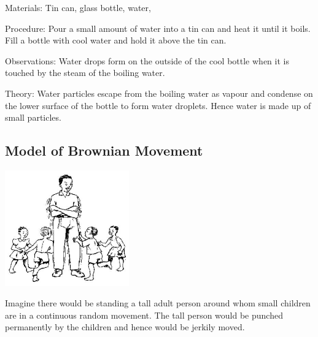 \begin{multicols}{2}
\begin{description*}
\item[Materials:]{Tin can, glass bottle, water, }
\item[Procedure:]{Pour a small amount of water into a tin can and heat it until it boils. Fill a bottle with cool water and hold it above the tin can.}
\item[Observations:]{Water drops form on the outside of the cool bottle when it is touched by the steam of the boiling water.}
\item[Theory:]{Water particles escape from the boiling water as vapour and condense on the lower surface of the bottle to form water droplets. Hence water is made up of small particles.}
\end{description*}

\subsection{Model of Brownian Movement}

\begin{center}
\includegraphics[width=0.4\textwidth]{./img/source/brownian.jpg}
\end{center}

Imagine there would be standing a tall adult person around whom small children are in a
continuous random movement. The tall person would be punched permanently by the
children and hence would be jerkily moved.



\end{multicols}
